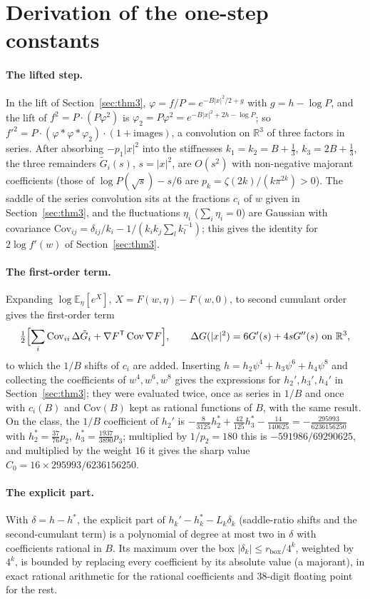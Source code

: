 \documentclass[11pt,a4paper]{article}
\theoremstyle{definition}
\theoremstyle{remark}
\newcommand{\E}{\mathbb{E}}
\newcommand{\R}{\mathbb{R}}
\begin{document}
\section{Derivation of the one-step constants}\label{app:const}

\paragraph{The lifted step.}
In the lift of Section~\ref{sec:thm3}, $\varphi=f/P=e^{-B|x|^2/2+g}$ with $g=h-\log P$, and the lift of $f^2=P\cdot(P\varphi^2)$ is $\varphi_2=P\varphi^2=e^{-B|x|^2+2h-\log P}$; so $f'^2=P\cdot(\varphi*\varphi*\varphi_2)\cdot(1+\text{images})$, a convolution on $\R^3$ of three factors in series.
After absorbing $-p_1|x|^2$ into the stiffnesses $k_1=k_2=B+\tfrac13$, $k_3=2B+\tfrac13$, the three remainders $\tilde G_i(s)$, $s=|x|^2$, are $O(s^2)$ with non-negative majorant coefficients (those of $\log P(\sqrt s)-s/6$ are $p_k=\zeta(2k)/(k\pi^{2k})>0$).
The saddle of the series convolution sits at the fractions $c_i$ of $w$ given in Section~\ref{sec:thm3}, and the fluctuations $\eta_i$ ($\sum_i\eta_i=0$) are Gaussian with covariance $\mathrm{Cov}_{ij}=\delta_{ij}/k_i-1/(k_ik_j\sum_lk_l^{-1})$; this gives the identity for $2\log f'(w)$ of Section~\ref{sec:thm3}.

\paragraph{The first-order term.}
Expanding $\log\E_\eta[e^{X}]$, $X=F(w,\eta)-F(w,0)$, to second cumulant order gives the first-order term
\[
\tfrac12\Bigl[\sum_i\mathrm{Cov}_{ii}\,\Delta\tilde G_i+\nabla F^{\mathsf T}\,\mathrm{Cov}\,\nabla F\Bigr],\qquad \Delta G(|x|^2)=6G'(s)+4sG''(s)\ \text{on }\R^3,
\]
to which the $1/B$ shifts of $c_i$ are added.
Inserting $h=h_2\psi^4+h_3\psi^6+h_4\psi^8$ and collecting the coefficients of $w^4,w^6,w^8$ gives the expressions for $h_2',h_3',h_4'$ in Section~\ref{sec:thm3}; they were evaluated twice, once as series in $1/B$ and once with $c_i(B)$ and $\mathrm{Cov}(B)$ kept as rational functions of $B$, with the same result.
On the class, the $1/B$ coefficient of $h_2'$ is $-\tfrac8{3125}h_2^*+\tfrac{42}{125}h_3^*-\tfrac{14}{140625}=-\tfrac{295993}{6236156250}$ with $h_2^*=\tfrac{37}{76}p_2$, $h_3^*=\tfrac{1937}{3890}p_3$; multiplied by $1/p_2=180$ this is $-591986/69290625$, and multiplied by the weight $16$ it gives the sharp value $C_0=16\times295993/6236156250$.

\paragraph{The explicit part.}
With $\delta=h-h^*$, the explicit part of $h_k'-h_k^*-L_k\delta_k$ (saddle-ratio shifts and the second-cumulant term) is a polynomial of degree at most two in $\delta$ with coefficients rational in $B$.
Its maximum over the box $|\delta_k|\le r_{\mathrm{box}}/4^k$, weighted by $4^k$, is bounded by replacing every coefficient by its absolute value (a majorant), in exact rational arithmetic for the rational coefficients and $38$-digit floating point for the rest.
\end{document}
